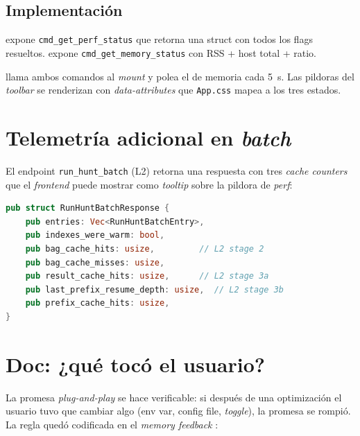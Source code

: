 \subsection{Implementación}

 expone
\texttt{cmd\_get\_perf\_status} que retorna una struct con todos los
flags resueltos. 
expone \texttt{cmd\_get\_memory\_status} con RSS + host total +
ratio.

 llama ambos comandos al \emph{mount}
y polea el de memoria cada 5~s. Las pildoras del \emph{toolbar} se
renderizan con \emph{data-attributes} que \texttt{App.css} mapea a
los tres estados.

\section{Telemetría adicional en \emph{batch}}

El endpoint \texttt{run\_hunt\_batch} (L2) retorna una respuesta
con tres \emph{cache counters} que el \emph{frontend} puede mostrar
como \emph{tooltip} sobre la pildora de \emph{perf}:

\begin{lstlisting}[language=Rust]
pub struct RunHuntBatchResponse {
    pub entries: Vec<RunHuntBatchEntry>,
    pub indexes_were_warm: bool,
    pub bag_cache_hits: usize,         // L2 stage 2
    pub bag_cache_misses: usize,
    pub result_cache_hits: usize,      // L2 stage 3a
    pub last_prefix_resume_depth: usize,  // L2 stage 3b
    pub prefix_cache_hits: usize,
}
\end{lstlisting}

\section{Doc: ¿qué tocó el usuario?}

La promesa \emph{plug-and-play} se hace verificable: si después de
una optimización el usuario tuvo que cambiar algo (env var, config
file, \emph{toggle}), la promesa se rompió. La regla quedó codificada
en el \emph{memory feedback} :

